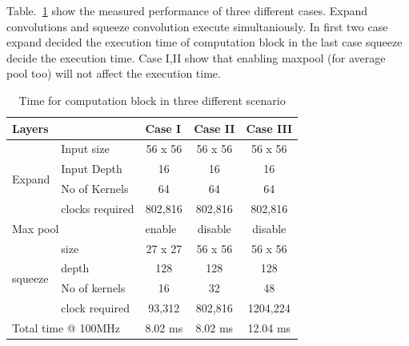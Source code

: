 \documentclass[conference]{IEEEtran}
\begin{document}
Table.~\ref{tab2} show the measured performance of three different cases. Expand convolutions and squeeze convolution execute simultaniously. In first two case expand decided the execution time of computation block in the last case squeeze decide the execution time. Case I,II show that enabling maxpool (for average pool too) will not affect the execution time.


\begin{table}[htbp]
\caption{Time for computation block in three different scenario}
\begin{tabular}{|l|l|c|c|c|}
\hline
\multicolumn{2}{|l|}{Layers}               & \multicolumn{1}{l|}{Case I}  & Case II & Case III \\ \hline
\multirow{4}{*}{Expand}  & Input size      & 56 x 56                      & 56 x 56 & 56 x 56  \\ \cline{2-5} 
                         & Input Depth     & 16                           & 16      & 16       \\ \cline{2-5} 
                         & No of Kernels   & 64                           & 64      & 64       \\ \cline{2-5} 
                         & clocks required & 802,816                      & 802,816 & 802,816  \\ \hline
\multicolumn{2}{|l|}{Max pool}             & \multicolumn{1}{l|}{enable}  & disable & disable  \\ \hline
\multirow{4}{*}{squeeze} & size            & 27 x 27                      & 56 x 56 & 56 x 56  \\ \cline{2-5} 
                         & depth           & 128                          & 128     & 128      \\ \cline{2-5} 
                         & No of kernels   & 16                           & 32      & 48       \\ \cline{2-5} 
                         & clock required  & 93,312                       & 802,816 & 1204,224 \\ \hline
\multicolumn{2}{|l|}{Total time @ 100MHz}  & \multicolumn{1}{l|}{8.02 ms} & 8.02 ms & 12.04 ms \\ \hline
\end{tabular}
  \label{tab2}
\end{table}
\end{document}
